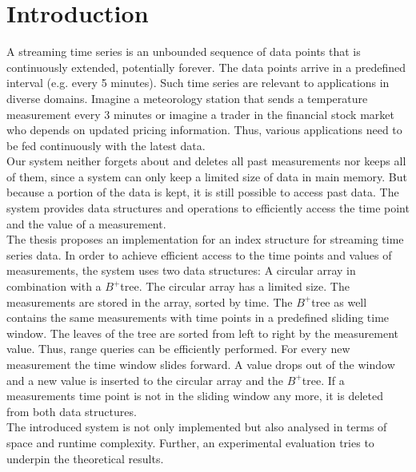 \documentclass[abstracton,12pt,oneside]{scrreprt}
\begin{document}
\tableofcontents
\listoffigures
\listoftables
\listofalgorithms
\renewcommand{\lstlistingname}{Algorithm}%
\renewcommand{\listtablename}{Tables}


\chapter{Introduction}
A streaming time series is an unbounded sequence of data points that is continuously extended, potentially forever. The data points arrive in a predefined interval (e.g. every 5 minutes). Such time series are relevant to applications in diverse domains. Imagine a meteorology station that sends a temperature measurement every 3 minutes or imagine a trader in the financial stock market who depends on updated pricing information. Thus, various applications need to be fed continuously with the latest data. \\
Our system neither forgets about and deletes all past measurements nor keeps all of them, since a system can only keep a limited size of data in main memory. But because a portion of the data is kept, it is still possible to access past data. The system provides data structures and operations to efficiently access the time point and the value of a measurement.\\
The thesis proposes an implementation for an index structure for streaming time series data. In order to achieve efficient access to the time points and values of  measurements, the system uses two data structures: A circular array in combination with a $B^+$tree. The circular array has a limited size. The measurements are stored in the array, sorted by time. The $B^+$tree as well contains the same measurements with time points in a predefined sliding time window. The leaves of the tree are sorted from left to right by the measurement value. Thus, range queries can be efficiently performed. For every new measurement the time window slides forward. A value drops out of the window and a new value is inserted to the circular array and the $B^+$tree. If a measurements time point is not in the sliding window any more, it is deleted from both data structures. 
\\The introduced system is not only implemented but also analysed in terms of space and runtime complexity. Further, an experimental evaluation tries to underpin the theoretical results.
\\ \\
\end{document}
